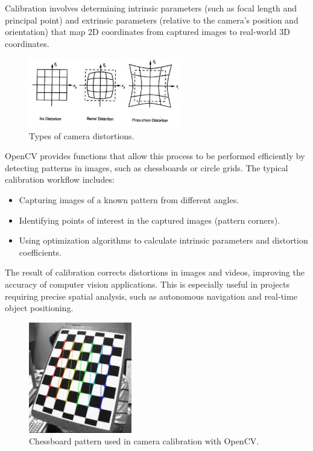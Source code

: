     Calibration involves determining intrinsic parameters (such as focal length and principal point) and extrinsic parameters (relative to the camera's position and orientation) that map 2D coordinates from captured images to real-world 3D coordinates.  
    
    \begin{figure}[h!] 
        \centering 
        \includegraphics[width=0.6\textwidth]{pictures/distortions.png} %
        \caption{Types of camera distortions.} 
        \label{fig:distortions} 
    \end{figure}  
    
    OpenCV provides functions that allow this process to be performed efficiently by detecting patterns in images, such as chessboards or circle grids. The typical calibration workflow includes:  
    
    \begin{itemize}
        \item Capturing images of a known pattern from different angles.  
        \item Identifying points of interest in the captured images (pattern corners).  
        \item Using optimization algorithms to calculate intrinsic parameters and distortion coefficients.  
    \end{itemize}  
    
    The result of calibration corrects distortions in images and videos, improving the accuracy of computer vision applications. This is especially useful in projects requiring precise spatial analysis, such as autonomous navigation and real-time object positioning.  
    
    \begin{figure}[h!] 
        \centering 
        \includegraphics[width=0.4\textwidth]{pictures/calib_pattern.jpg} %
        \caption{Chessboard pattern used in camera calibration with OpenCV.} 
        \label{fig:calib_pattern} 
    \end{figure}  



